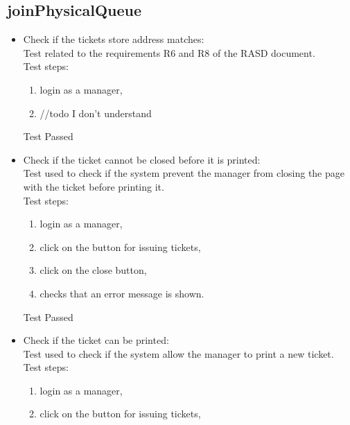 \subsection{joinPhysicalQueue}

\begin{itemize}
    \item Check if the tickets store address matches: \\
    Test related to the requirements R6 and R8 of the RASD document. \\
    Test steps: \\
    \begin{enumerate}

        \item login as a manager,

        \item //todo I don't understand
    \end{enumerate}
    Test Passed

    \item Check if the ticket cannot be closed before it is printed: \\
    Test used to check if the system prevent the manager from closing the page with the ticket before printing it. \\
    Test steps: \\
    \begin{enumerate}
        \item login as a manager,

        \item click on the button for issuing tickets,

        \item click on the close button,

        \item checks that an error message is shown.
    \end{enumerate}
    Test Passed \\

    \item Check if the ticket can be printed: \\
    Test used to check if the system allow the manager to print a new ticket. \\
    Test steps:\\
    \begin{enumerate}
        \item login as a manager,

        \item click on the button for issuing tickets,


\end{enumerate}
\end{itemize}
